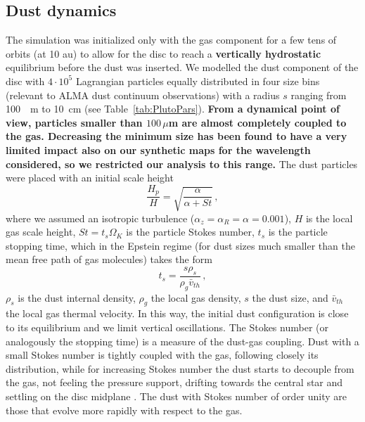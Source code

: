 \documentclass[fleqn,usenatbib]{mnras}
\begin{document}
    \subsection{Dust dynamics}\label{sec:dust}
    
        The simulation was initialized only with the gas component for a few tens of orbits (at 10 au) to allow for the disc to reach a \textbf{vertically hydrostatic} equilibrium before the dust was inserted.
        We modelled the dust component of the disc with $4\cdot10^5$ Lagrangian particles equally distributed in four size bins (relevant to ALMA dust continuum observations) with a radius $s$ ranging from \SI{100}{\mu m} to \SI{10}{cm} (see Table~\ref{tab:PlutoPars}).
        \textbf{From a dynamical point of view, particles smaller than $100 \, \mu$m are almost completely coupled to the gas. Decreasing the minimum size has been found to have a very limited impact also on our synthetic maps for the wavelength considered, so we restricted our analysis to this range.}
        The dust particles were placed with an initial scale height \citep{Youdin2007}
        \begin{equation}\label{eq:scale-height}
            \frac{H_p}{H} = \sqrt{\frac{\alpha}{\alpha + St}}\,,
        \end{equation}
        where we assumed an isotropic turbulence ($\alpha_z = \alpha_R = \alpha = 0.001$), $H$ is the local gas scale height, $St = t_s\Omega_K$ is the particle Stokes number, $t_s$ is the particle stopping time, which in the Epstein regime (for dust sizes much smaller than the mean free path of gas molecules) takes the form
        \begin{equation}\label{eq:Stokes_number}
            t_s = \frac{s\rho_s}{\rho_g\bar{v}_{th}}\,,
        \end{equation}
        $\rho_s$ is the dust internal density, $\rho_g$ the local gas density, $s$ the dust size, and $\bar{v}_{th}$ the local gas thermal velocity. In this way, the initial dust configuration is close to its equilibrium and we limit vertical oscillations.
        The Stokes number (or analogously the stopping time) is a measure of the dust-gas coupling. Dust with a small Stokes number is tightly coupled with the gas, following closely its distribution, while for increasing Stokes number the dust starts to decouple from the gas, not feeling the pressure support, drifting towards the central star and settling on the disc midplane \citep{Whipple1972,Weidenschilling1977}. The dust with Stokes number of order unity are those that evolve more rapidly with respect to the gas.
\end{document}
